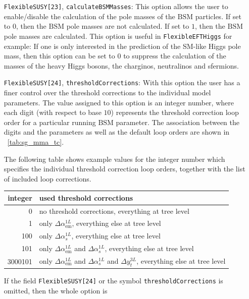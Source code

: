 \documentclass[final,3p,11pt,pdflatex]{elsarticle}
\makeatletter
\newcommand{\feft}{\texttt{Flex\-ib\-le\-EFT\-Higgs}\@\xspace}
\newcommand{\BSM}{\ensuremath{\text{BSM}}\xspace}
\newcommand{\tabref}[1]{\tablename~\ref{#1}}
\def\as{\alpha_s}
\def\aem{\alpha_{\text{em}}}
\makeatother
\begin{document}
\begin{itemize}
\item[\texttt{FlexibleSUSY[23]},] \texttt{calculateBSMMasses}: This
  option allows the user to enable/disable the calculation of the pole
  masses of the \BSM particles.  If set to $0$, then the \BSM pole
  masses are not calculated.  If set to $1$, then the \BSM pole masses
  are calculated.  This option is useful in \feft for example: If one
  is only interested in the prediction of the SM-like Higgs pole mass,
  then this option can be set to $0$ to suppress the calculation of
  the masses of the heavy Higgs bosons, the charginos, neutralinos and sfermions.

\item[\texttt{FlexibleSUSY[24]},] \texttt{thresholdCorrections}: With
  this option the user has a finer control over the threshold
  corrections to the individual model parameters.  The value assigned
  to this option is an integer number, where each digit (with respect to base
  $10$) represents the threshold correction loop order for a
  particular running \BSM parameter.  The association between the
  digits and the parameters as well as the default loop orders are
  shown in \tabref{tab:sg_mma_tc}.
  \begin{example}
    The following table shows example values for the integer number
    which specifies the individual threshold correction loop orders,
    together with the list of included loop corrections.
    \begin{center}
    \begin{tabular}{rl}
      \toprule
      integer & used threshold corrections \\
      \midrule
      0       & no threshold corrections, everything at tree level \\
      1       & only $\Delta\aem^{1L}$, everything else at tree level \\
      100     & only $\Delta\as^{1L}$, everything else at tree level \\
      101     & only $\Delta\aem^{1L}$ and  $\Delta\as^{1L}$, everything else at tree level \\
      3000101 & only $\Delta\aem^{1L}$ and  $\Delta\as^{1L}$ and  $\Delta y_t^{3L}$, everything else at tree level \\
      \bottomrule
    \end{tabular}
  \end{center}
  \end{example}
  If the field \texttt{FlexibleSUSY[24]} or the symbol
  \texttt{thresholdCorrections} is omitted, then the whole option is

\end{itemize}
\end{document}
